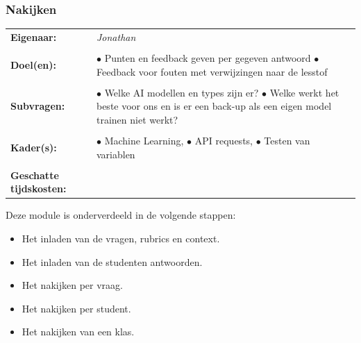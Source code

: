\documentclass[12pt]{article}
\begin{document}
\pagebreak

\subsubsection{Nakijken} \label{methode-nakijken}
\noindent\begin{tabularx}{\linewidth}{ll}
    \textbf{Eigenaar: } & \textit{Jonathan} \\ \\
    \textbf{Doel(en): } & 
        \makecell[tl]{
            $\bullet$ Punten en feedback geven per gegeven antwoord \\
            $\bullet$ Feedback voor fouten met verwijzingen naar de lesstof
        } \\ \\
    \textbf{Subvragen: } & 
        \makecell[tl]{
            $\bullet$ Welke AI modellen en types zijn er? \\
            $\bullet$ Welke werkt het beste voor ons en is er een back-up als een eigen model\\ trainen niet werkt?
        } \\ \\
    \textbf{Kader(s): } & 
        \makecell[tl]{
            $\bullet$ Machine Learning, \\
            $\bullet$ API requests, \\
            $\bullet$ Testen van variablen
        } \\ \\
    \parbox[t]{3cm}{\raggedright\textbf{Geschatte tijdskosten:} } &   \\
\end{tabularx}

\noindent Deze module is onderverdeeld in de volgende stappen:
\begin{itemize} 
    \item Het inladen van de vragen, rubrics en context. 
    \item Het inladen van de studenten antwoorden. 
    \item Het nakijken per vraag.
    \item Het nakijken per student.
    \item Het nakijken van een klas.
\end{itemize}
\end{document}
